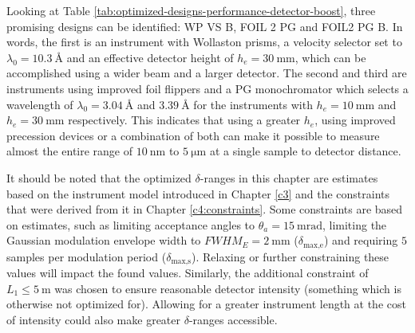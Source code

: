 Looking at Table \ref{tab:optimized-designs-performance-detector-boost}, three promising designs can be identified: WP VS B, FOIL 2 PG and FOIL2 PG B. In words, the first is an instrument with Wollaston prisms, a velocity selector set to $\lambda_0 = \SI{10.3}{\angstrom}$ and an effective detector height of $h_e = \SI{30}{\milli\meter}$, which can be accomplished using a wider beam and a larger detector. The second and third are instruments using improved foil flippers and a PG monochromator which selects a wavelength of $\lambda_0 = \SI{3.04}{\angstrom}$ and $\SI{3.39}{\angstrom}$ for the instruments with $h_e = \SI{10}{\milli\meter}$ and $h_e = \SI{30}{\milli\meter}$ respectively. This indicates that using a greater $h_e$, using improved precession devices or a combination of both can make it possible to measure almost the entire range of $\SI{10}{\nano\meter}$ to $ \SI{5}{\micro\meter}$ at a single sample to detector distance. 

It should be noted that the optimized $\delta$-ranges in this chapter are estimates based on the instrument model introduced in Chapter \ref{c3} and the constraints that were derived from it in Chapter \ref{c4:constraints}. Some constraints are based on estimates, such as limiting acceptance angles to $\theta_a = \SI{15}{\milli\radian}$, limiting the Gaussian modulation envelope width to $FWHM_E = \SI{2}{\milli\meter}$ ($\delta_{\text{max,e}}$) and requiring $5$ samples per modulation period ($\delta_{\text{max,s}}$). Relaxing or further constraining these values will impact the found values. Similarly, the additional constraint of $L_1 \leq \SI{5}{\meter}$ was chosen to ensure reasonable detector intensity (something which is otherwise not optimized for). Allowing for a greater instrument length at the cost of intensity could also make greater $\delta$-ranges accessible.


